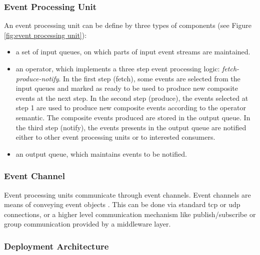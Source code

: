 \documentclass[a4paper,twoside]{article}
\begin{document}
\subsubsection{Event Processing Unit}
An event processing unit can be define by three types of components (see Figure \ref{fig:event processing unit}):
\begin{itemize}
\item a set of input queues, on which parts of input event streams are maintained. 
\item an operator, which implements a three step event processing logic: \textit{fetch-produce-notify}. In the first step (fetch), some events are selected from the input queues and marked as ready to be used to produce new composite events at the next step. In the second step (produce), the events selected at step 1 are used to produce new composite events according to the operator semantic. The composite events produced are stored in the output queue. In the third step (notify), the events presents in the output queue are notified either to other event processing units or to interested consumers.  
\item an output queue, which maintains events to be notified.
\end{itemize}

\subsubsection{Event Channel}
Event processing units communicate through event channels. Event channels are means of conveying event objects \cite{Luckham2011}. This can be done via standard tcp or udp connections, or a higher level communication mechanism like publish/subscribe \cite{Eugster2003} or group communication  \cite{Chockler2001} provided by a middleware layer.

\subsubsection{Deployment Architecture}
\label{sec:architecture}
\end{document}
